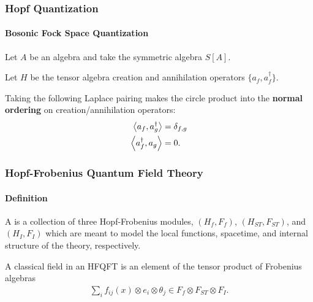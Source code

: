 \documentclass{beamer}
\begin{document}
\begin{frame}


\frametitle{Hopf Quantization}

\framesubtitle{Bosonic Fock Space Quantization}



 Let $A$ be an algebra and take the symmetric algebra $S[A]$.

 Let $H$ be the tensor algebra creation and annihilation operators $\{ a_f, a_f^\dagger \}$.

 Taking the following Laplace pairing makes the circle product into the \textbf{normal ordering} on creation/annihilation operators:
%
\begin{align*}
\left\langle a_f, a_g^\dagger \right\rangle &= \delta_{f,g} \\
\left\langle a_f^{\dagger}, a_g \right\rangle &= 0.
\end{align*}



\end{frame}







\begin{frame}


\frametitle{Hopf-Frobenius Quantum Field Theory}

\framesubtitle{Definition}


A  is a collection of three Hopf-Frobenius modules, $(H_f, F_f)$, $(H_{ST}, F_{ST})$, and $(H_I, F_I)$ which are meant to model the local functions, spacetime, and internal structure of the theory, respectively.


 A classical field in an HFQFT is an element of the tensor product of Frobenius algebras
\begin{align*}
\sum_i f_{ij}(x) \otimes e_i \otimes \theta_j \in F_f \otimes F_{ST} \otimes F_I.
\end{align*}


\end{frame}





\end{document}
